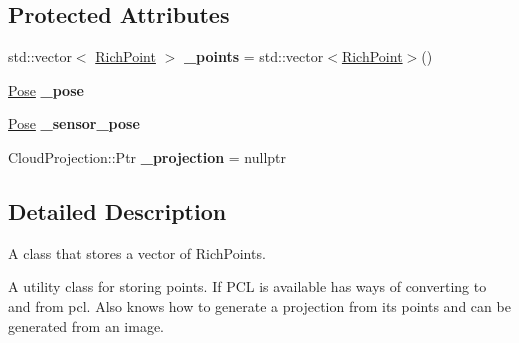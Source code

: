\subsection*{Protected Attributes}
\begin{DoxyCompactItemize}
\item 
\hypertarget{classdepth__clustering_1_1Cloud_a3d03917e25e751083342f17c4ef664a5}{std\-::vector$<$ \hyperlink{classdepth__clustering_1_1RichPoint}{Rich\-Point} $>$ {\bfseries \-\_\-points} = std\-::vector$<$\hyperlink{classdepth__clustering_1_1RichPoint}{Rich\-Point}$>$()}\label{classdepth__clustering_1_1Cloud_a3d03917e25e751083342f17c4ef664a5}

\item 
\hypertarget{classdepth__clustering_1_1Cloud_a3b6a1ada445763ab4b9ac9519bb225f1}{\hyperlink{classdepth__clustering_1_1Pose}{Pose} {\bfseries \-\_\-pose}}\label{classdepth__clustering_1_1Cloud_a3b6a1ada445763ab4b9ac9519bb225f1}

\item 
\hypertarget{classdepth__clustering_1_1Cloud_a6399645406eaa1312ca4a469d7c4db1f}{\hyperlink{classdepth__clustering_1_1Pose}{Pose} {\bfseries \-\_\-sensor\-\_\-pose}}\label{classdepth__clustering_1_1Cloud_a6399645406eaa1312ca4a469d7c4db1f}

\item 
\hypertarget{classdepth__clustering_1_1Cloud_a5f60147c48b39a951d4fa72ba60ef370}{Cloud\-Projection\-::\-Ptr {\bfseries \-\_\-projection} = nullptr}\label{classdepth__clustering_1_1Cloud_a5f60147c48b39a951d4fa72ba60ef370}

\end{DoxyCompactItemize}


\subsection{Detailed Description}
A class that stores a vector of Rich\-Points. 

A utility class for storing points. If P\-C\-L is available has ways of converting to and from pcl. Also knows how to generate a projection from its points and can be generated from an image. 


